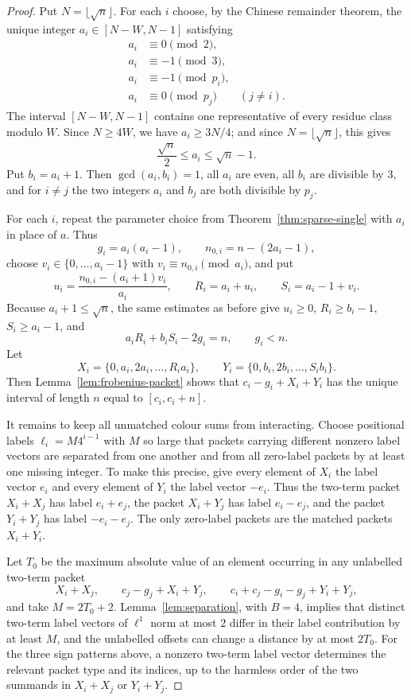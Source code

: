 \documentclass[11pt]{article}
\begin{document}
\begin{proof}
Put $N=\lfloor\sqrt n\rfloor$. For each $i$ choose, by the Chinese remainder
theorem, the unique integer $a_i\in[N-W,N-1]$ satisfying
\[
\begin{aligned}
 a_i&\equiv0 \pmod 2,\\
 a_i&\equiv-1 \pmod 3,\\
 a_i&\equiv-1 \pmod {p_i},\\
 a_i&\equiv0 \pmod {p_j}\qquad (j\neq i).
\end{aligned}
\]
The interval $[N-W,N-1]$ contains one representative of every residue class
modulo $W$. Since $N\geq4W$, we have $a_i\geq3N/4$; and since
$N=\lfloor\sqrt n\rfloor$, this gives
\[
 \frac{\sqrt n}{2}\leq a_i\leq \sqrt n-1.
\]
Put $b_i=a_i+1$. Then $\gcd(a_i,b_i)=1$, all $a_i$ are even, all $b_i$ are
divisible by $3$, and for $i\neq j$ the two integers $a_i$ and $b_j$ are both
divisible by $p_j$.

For each $i$, repeat the parameter choice from
Theorem~\ref{thm:sparse-single} with $a_i$ in place of $a$. Thus
\[
 g_i=a_i(a_i-1),\qquad n_{0,i}=n-(2a_i-1),
\]
choose $v_i\in\{0,\ldots,a_i-1\}$ with $v_i\equiv n_{0,i}\pmod {a_i}$, and
put
\[
 u_i=\frac{n_{0,i}-(a_i+1)v_i}{a_i},\qquad
 R_i=a_i+u_i,\qquad S_i=a_i-1+v_i.
\]
Because $a_i+1\leq\sqrt n$, the same estimates as before give
$u_i\geq0$, $R_i\geq b_i-1$, $S_i\geq a_i-1$, and
\[
 a_iR_i+b_iS_i-2g_i=n,\qquad g_i<n.
\]
Let
\[
 X_i=\{0,a_i,2a_i,\ldots,R_i a_i\},
 \qquad
 Y_i=\{0,b_i,2b_i,\ldots,S_i b_i\}.
\]
Then Lemma~\ref{lem:frobenius-packet} shows that
$c_i-g_i+X_i+Y_i$ has the unique interval of length $n$ equal to
$[c_i,c_i+n]$.

It remains to keep all unmatched colour sums from interacting. Choose
positional labels $\ell_i=M4^{i-1}$ with $M$ so large that packets carrying
different nonzero label vectors are separated from one another and from all
zero-label packets by at least one missing integer. To make this precise,
give every element of $X_i$ the label vector $e_i$ and every element of $Y_i$
the label vector $-e_i$. Thus the two-term packet $X_i+X_j$ has label
$e_i+e_j$, the packet $X_i+Y_j$ has label $e_i-e_j$, and the packet
$Y_i+Y_j$ has label $-e_i-e_j$. The only zero-label packets are the matched
packets $X_i+Y_i$.

Let $T_0$ be the maximum absolute value of an element occurring in any
unlabelled two-term packet
\[
 X_i+X_j,\qquad c_j-g_j+X_i+Y_j,\qquad
 c_i+c_j-g_i-g_j+Y_i+Y_j,
\]
and take $M=2T_0+2$. Lemma~\ref{lem:separation}, with $B=4$, implies that
distinct two-term label vectors of $\ell^1$ norm at most $2$ differ in their
label contribution by at least $M$, and the unlabelled offsets can change a
distance by at most $2T_0$. For the three sign patterns above, a nonzero
two-term label vector determines the relevant packet type and its indices, up
to the harmless order of the two summands in $X_i+X_j$ or $Y_i+Y_j$.


\end{proof}
\end{document}
